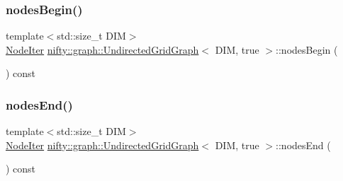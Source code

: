 \mbox{\label{classnifty_1_1graph_1_1UndirectedGridGraph_3_01DIM_00_01true_01_4_a80d8927ae70538acbb291a3287527dd6}} 
\subsubsection{\texorpdfstring{nodes\+Begin()}{nodesBegin()}}
{\footnotesize\ttfamily template$<$std\+::size\+\_\+t D\+IM$>$ \\
\hyperlink{classnifty_1_1graph_1_1UndirectedGridGraph_3_01DIM_00_01true_01_4_a977e01bd675cc7d454ce18417c6e0397}{Node\+Iter} \hyperlink{classnifty_1_1graph_1_1UndirectedGridGraph}{nifty\+::graph\+::\+Undirected\+Grid\+Graph}$<$ D\+IM, true $>$\+::nodes\+Begin (\begin{DoxyParamCaption}{ }\end{DoxyParamCaption}) const\hspace{0.3cm}{\ttfamily [inline]}}

\mbox{\label{classnifty_1_1graph_1_1UndirectedGridGraph_3_01DIM_00_01true_01_4_a43de71583952ce340db152eff0b3cd12}} 
\subsubsection{\texorpdfstring{nodes\+End()}{nodesEnd()}}
{\footnotesize\ttfamily template$<$std\+::size\+\_\+t D\+IM$>$ \\
\hyperlink{classnifty_1_1graph_1_1UndirectedGridGraph_3_01DIM_00_01true_01_4_a977e01bd675cc7d454ce18417c6e0397}{Node\+Iter} \hyperlink{classnifty_1_1graph_1_1UndirectedGridGraph}{nifty\+::graph\+::\+Undirected\+Grid\+Graph}$<$ D\+IM, true $>$\+::nodes\+End (\begin{DoxyParamCaption}{ }\end{DoxyParamCaption}) const\hspace{0.3cm}{\ttfamily [inline]}}

